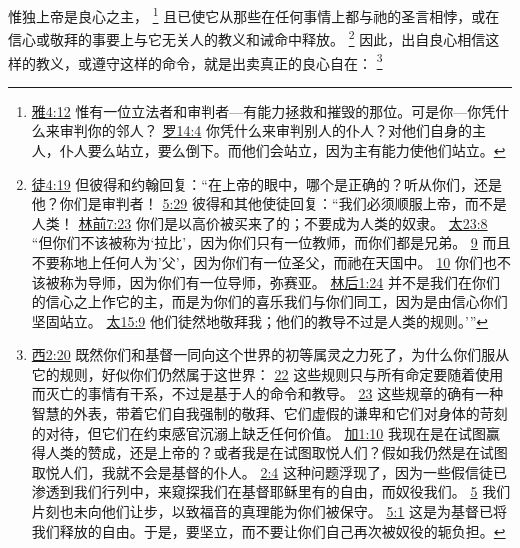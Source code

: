 \documentclass[12pt, a4paper, oneside]{ctexart}
\newcounter{parnum}[section]
\newcommand{\N}{%
   \noindent\refstepcounter{parnum}%
    \makebox[\parindent][l]{\textbf{\arabic{parnum}.}}}
\begin{document}
\N 惟独上帝是良心之主，
	\footnote {
		\href{https://biblehub.com/james/4-12.htm}{雅4:12} 惟有一位立法者和审判者---有能力拯救和摧毁的那位。可是你---你凭什么来审判你的邻人？
		\href{https://biblehub.com/romans/14-4.htm}{罗14:4} 你凭什么来审判别人的仆人？对他们自身的主人，仆人要么站立，要么倒下。而他们会站立，因为主有能力使他们站立。
	}
	且已使它从那些在任何事情上都与祂的圣言相悖，或在信心或敬拜的事要上与它无关人的教义和诫命中释放。
	\footnote {
		\href{https://biblehub.com/acts/4-19.htm}{徒4:19} 但彼得和约翰回复：“在上帝的眼中，哪个是正确的？听从你们，还是他？你们是审判者！
		\href{https://biblehub.com/acts/5-29.htm}{5:29} 彼得和其他使徒回复：“我们必须顺服上帝，而不是人类！ 
        \href{https://biblehub.com/1_corinthians/7-23.htm}{林前7:23} 你们是以高价被买来了的；不要成为人类的奴隶。
		\href{https://biblehub.com/matthew/23-8.htm}{太23:8} “但你们不该被称为‘拉比’，因为你们只有一位教师，而你们都是兄弟。
		\href{https://biblehub.com/matthew/23-9.htm}{9} 而且不要称地上任何人为'父'，因为你们有一位圣父，而祂在天国中。
		\href{https://biblehub.com/matthew/23-10.htm}{10} 你们也不该被称为导师，因为你们有一位导师，弥赛亚。
		\href{https://biblehub.com/2_corinthians/1-24.htm}{林后1:24} 并不是我们在你们的信心之上作它的主，而是为你们的喜乐我们与你们同工，因为是由信心你们坚固站立。
		\href{https://biblehub.com/matthew/15-9.htm}{太15:9} 他们徒然地敬拜我；他们的教导不过是人类的规则。’”
	}
	因此，出自良心相信这样的教义，或遵守这样的命令，就是出卖真正的良心自在：
	\footnote {
		\href{https://biblehub.com/colossians/2-20.htm}{西2:20} 既然你们和基督一同向这个世界的初等属灵之力死了，为什么你们服从它的规则，好似你们仍然属于这世界：
		\href{https://biblehub.com/colossians/2-22.htm}{22} 这些规则只与所有命定要随着使用而灭亡的事情有干系，不过是基于人的命令和教导。
		\href{https://biblehub.com/colossians/2-23.htm}{23} 这些规章的确有一种智慧的外表，带着它们自我强制的敬拜、它们虚假的谦卑和它们对身体的苛刻的对待，但它们在约束感官沉溺上缺乏任何价值。
		\href{https://biblehub.com/galatians/1-10.htm}{加1:10} 我现在是在试图赢得人类的赞成，还是上帝的？或者我是在试图取悦人们？假如我仍然是在试图取悦人们，我就不会是基督的仆人。
		\href{https://biblehub.com/galatians/2-4.htm}{2:4} 这种问题浮现了，因为一些假信徒已渗透到我们行列中，来窥探我们在基督耶稣里有的自由，而奴役我们。
		\href{https://biblehub.com/galatians/2-5.htm}{5} 我们片刻也未向他们让步，以致福音的真理能为你们被保守。
		\href{https://biblehub.com/galatians/5-1.htm}{5:1} 这是为基督已将我们释放的自由。于是，要坚立，而不要让你们自己再次被奴役的轭负担。
	}
\end{document}
